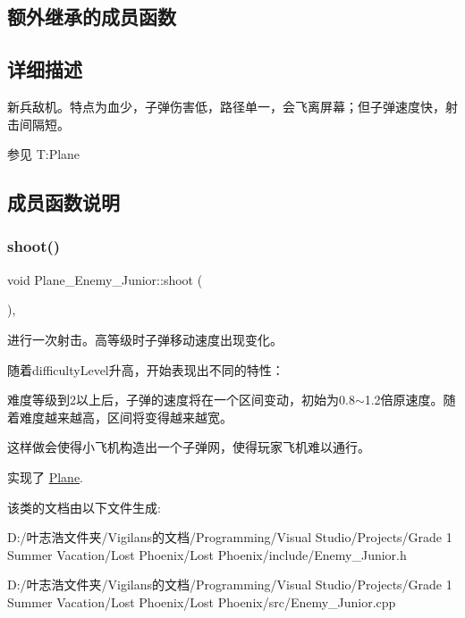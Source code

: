 \subsection*{额外继承的成员函数}


\subsection{详细描述}
新兵敌机。特点为血少，子弹伤害低，路径单一，会飞离屏幕；但子弹速度快，射击间隔短。 

\begin{DoxySeeAlso}{参见}
T\+:\+Plane


\end{DoxySeeAlso}


\subsection{成员函数说明}
\mbox{\label{class_plane___enemy___junior_a5ffc4150cdf4c6e81480a2977d4bfafe}} 
\subsubsection{\texorpdfstring{shoot()}{shoot()}}
{\footnotesize\ttfamily void Plane\+\_\+\+Enemy\+\_\+\+Junior\+::shoot (\begin{DoxyParamCaption}{ }\end{DoxyParamCaption})\hspace{0.3cm}{\ttfamily [override]}, {\ttfamily [virtual]}}



进行一次射击。高等级时子弹移动速度出现变化。 

随着difficulty\+Level升高，开始表现出不同的特性：
\begin{DoxyItemize}
\item 难度等级到2以上后，子弹的速度将在一个区间变动，初始为0.8$\sim$1.2倍原速度。随着难度越来越高，区间将变得越来越宽。
\item 这样做会使得小飞机构造出一个子弹网，使得玩家飞机难以通行。 
\end{DoxyItemize}

实现了 \hyperlink{class_plane}{Plane}.



该类的文档由以下文件生成\+:\begin{DoxyCompactItemize}
\item 
D\+:/叶志浩文件夹/\+Vigilans的文档/\+Programming/\+Visual Studio/\+Projects/\+Grade 1 Summer Vacation/\+Lost Phoenix/\+Lost Phoenix/include/Enemy\+\_\+\+Junior.\+h\item 
D\+:/叶志浩文件夹/\+Vigilans的文档/\+Programming/\+Visual Studio/\+Projects/\+Grade 1 Summer Vacation/\+Lost Phoenix/\+Lost Phoenix/src/Enemy\+\_\+\+Junior.\+cpp\end{DoxyCompactItemize}
